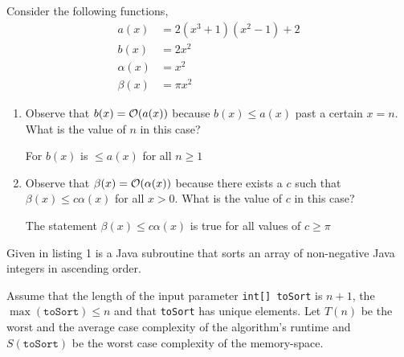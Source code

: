 \documentclass{homework}
\begin{document}
\question Consider the following functions,
\begin{align*}
  a(x)      & = 2(x^3+1)(x^2-1)+2 \\
  b(x)      & = 2x^2              \\
  \alpha(x) & = x^2               \\
  \beta(x)  & = \pi x^2
\end{align*}
\begin{enumerate}
  \item Observe that $b(x) = \mathcal{O}(a(x))$ because $b(x) \leq a(x)$ past a
        certain $x=n$. What is the value of $n$ in this case?

        \begin{sol}
          For $b(x)$ is $\leq a(x)$ for all $n \geq 1$
        \end{sol}

  \item Observe that $\beta(x) = \mathcal{O}(\alpha(x))$ because there exists a $c$
        such that $\beta(x) \leq c\alpha(x)$ for all $x > 0$. What is the
        value of $c$ in this case?

        \begin{sol}
          The statement $\beta(x) \leq c\alpha(x)$ is true for all values of $c \geq \pi$ 
        \end{sol}


\end{enumerate}

\question Given in listing 1 is a Java subroutine that sorts an
array of non-negative Java integers in ascending order.

%   

Assume that the length of the input parameter \texttt{int[]
  toSort} is $n + 1$, the ${\max(\texttt{toSort}) \leq n}$ and that
\texttt{toSort} has unique elements. Let $T(n)$ be the worst and
the average case complexity of the algorithm's runtime and
$S(\texttt{toSort})$ be the worst case complexity of the
memory-space.
\end{document}
